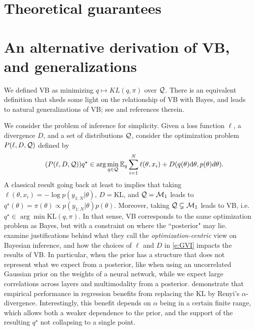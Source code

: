 \section{Theoretical guarantees}

\section{An alternative derivation of VB, and generalizations}
We defined VB as minimizing $q\mapsto KL(q,\pi)$ over $\mathcal{Q}$. 
There is an equivalent definition that sheds some light on the relationship of VB with Bayes, and leads to natural generalizations of VB; see \citep{KnJeDa22} and references therein.

We consider the problem of inference for simplicity. 
Given a loss function $\ell$, a divergence $D$, and a set of distributions $\mathcal{Q}$, consider the optimization problem $P(\ell, D, \mathcal{Q})$ defined by 
\begin{equation}
  \label{e:GVI}
  \tag{$P(\ell, D, \cQ)$}
  q^\star \in \arg\min_{q\in \cQ} \mathbb{E}_q \sum_{i=1}^N \ell(\theta, x_i) + D(q(\theta)\d\theta, p(\theta)d\theta).
\end{equation}
A classical result going back at least to \citep{DoVa75} implies that taking $\ell(\theta, x_i) = -\log p(y_{1:N}\vert \theta)$, $D=\text{KL}$, and $\mathcal{Q}=\mathcal{M}_1$ leads to $q^\star(\theta) = \pi(\theta) \propto p(y_{1:N}\vert\theta)p(\theta)$.
Moreover, taking $\mathcal{Q}\subsetneq \mathcal{M}_1$ leads to VB, i.e. $q^\star \in \arg\min \text{KL}(q,\pi)$.
In that sense, VB corresponds to the same optimization problem as Bayes, but with a constraint on where the ``posterior" may lie.  
\cite{KnJeDa22} examine justifications behind what they call the \emph{optimization-centric} view on Bayesian inference, and how the choices of $\ell$ and $D$ in \eqref{e:GVI} impacts the results of VB.
In particular, when the prior has a structure that does not represent what we expect from a posterior, like when using an uncorrelated Gaussian prior on the weights of a neural network, while we expect large correlations across layers and multimodality from a posterior.
\cite{KnJeDa22} demonstrate that empirical performance in regression benefits from replacing the KL by Renyi's $\alpha$-divergence. 
Interestingly, this benefit depends on $\alpha$ being in a certain finite range, which allows both a weaker dependence to the prior, and the support of the resulting $q^\star$ not collapsing to a single point. 